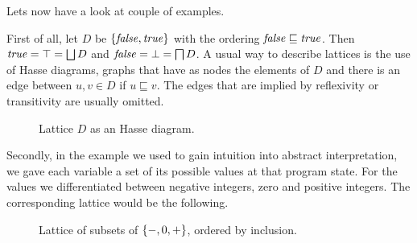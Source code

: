\documentclass[..thesis.tex]{subfiles}
\begin{document}

Lets now have a look at couple of examples. 

First of all, let $D$ be $\left\lbrace \mathit{false}, \mathit{true} \right\rbrace$ with the ordering $\mathit{false} \sqsubseteq \mathit{true}$.
Then $\mathit{true} = \top = \bigsqcup D$ and $\mathword{false} = \bot = \bigsqcap D$. A usual way to describe lattices is the use of Hasse diagrams,
graphs that have as nodes the elements of $D$ and there is an edge between $u, v \in D$ if $u \sqsubseteq v$.
The edges that are implied by reflexivity or transitivity are usually omitted.


\begin{figure}[H]
  \begin{center}
  \end{center}
  \caption{Lattice $D$ as an Hasse diagram.}
\end{figure}
 
Secondly, in the example we used to gain intuition into abstract interpretation, we gave each variable a set of its possible values at that program state.
For the values we differentiated between negative integers, zero and positive integers. The corresponding lattice would be the following.


\begin{figure}[H]
  \begin{center}
  \end{center}
  \caption{Lattice of subsets of ${\left\lbrace -, 0, + \right\rbrace}$, ordered by inclusion.}
\end{figure}
\end{document}
